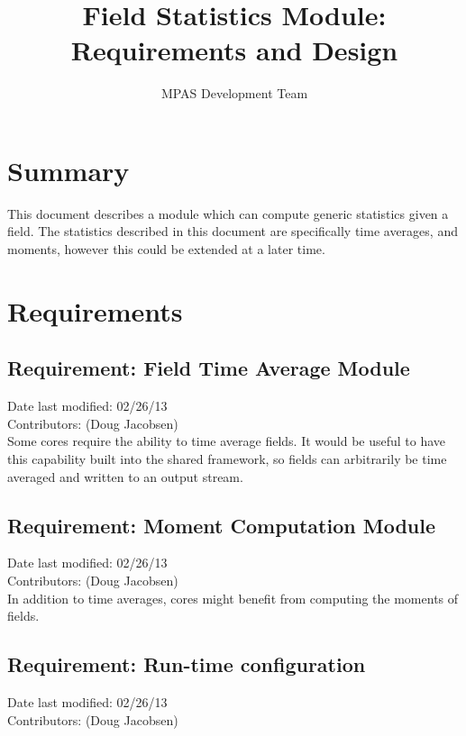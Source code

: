 \documentclass[11pt]{report}
\begin{document}
\title{Field Statistics Module: \\
Requirements and Design}
\author{MPAS Development Team}

\maketitle
\tableofcontents


\chapter{Summary}

This document describes a module which can compute generic statistics given a
field. The statistics described in this document are specifically time
averages, and moments, however this could be extended at a later time.


\chapter{Requirements}

\section{Requirement: Field Time Average Module}
Date last modified: 02/26/13 \\
Contributors: (Doug Jacobsen) \\

Some cores require the ability to time average fields. It would be useful to
have this capability built into the shared framework, so fields can arbitrarily
be time averaged and written to an output stream.

\section{Requirement: Moment Computation Module}
Date last modified: 02/26/13 \\
Contributors: (Doug Jacobsen) \\

In addition to time averages, cores might benefit from computing the moments of
fields. 

\section{Requirement: Run-time configuration}
Date last modified: 02/26/13 \\
Contributors: (Doug Jacobsen) \\
\end{document}
